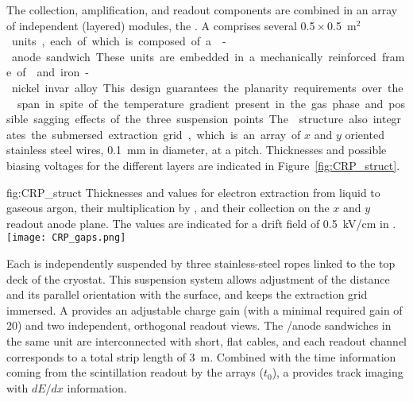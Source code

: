 The  collection, amplification, and readout components are combined in an array of independent (layered) modules, the . A  comprises several \num{0.5}\,$\times$\,\SI{0.5}{m$^2$} units, each of which is composed  of a -anode sandwich.  These units are embedded in a mechanically reinforced frame of \frfour and iron-nickel invar alloy. This design guarantees the planarity requirements over the  span in spite of the temperature gradient present in the gas phase and possible sagging effects of the three suspension points. The  structure also integrates  the submersed extraction grid, which is an array of $x$ and $y$ oriented stainless steel wires, \SI{0.1}{mm} in diameter, at a  \dpstrippitch pitch. Thicknesses and possible biasing voltages for the different layers are indicated in Figure~\ref{fig:CRP_struct}.

\begin{dunefigure}{fig:CRP_struct}
{Thicknesses and  values for electron extraction from liquid to gaseous argon, their  multiplication by , and their collection on the $x$ and $y$ readout anode plane. The  values are indicated for a drift field of \SI{0.5}{kV/cm} in .}
\texttt{[image: CRP\_gaps.png]}
\end{dunefigure}


Each  is independently suspended by three stainless-steel ropes linked to the top deck of the cryostat. This suspension system allows adjustment of the  distance and its parallel orientation with the  surface, and keeps the extraction grid immersed. A  provides an adjustable charge gain (with a minimal required gain of \num{20}) and two independent, orthogonal readout views. %
The /anode sandwiches  in the same  unit are interconnected with short, flat cables, and each readout channel corresponds to a total strip length of \SI{3}{m}. Combined with the time information coming from the  scintillation readout by the  arrays ($t_0$), a  provides \threed track imaging with $dE/dx$ information.  %


